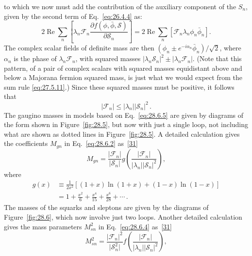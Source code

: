 to which we now must add the contribution of the auxiliary component of
the \(S_n\), given by the second term of Eq.~\eqref{eq:26.4.4} as:
\[
  2\operatorname{Re}\sum_n
  \left[
    \lambda_n\mathcal{F}_n
    \frac{\partial f(\phi,\bar\phi,\mathcal{S})}
         {\partial\mathcal{S}_n}
  \right]
  =2\operatorname{Re}\sum_n
  \left[\mathcal{F}_n\lambda_n\phi_n\bar\phi_n\right].
\]
The complex scalar fields of definite mass are then
\((\phi_n\pm e^{-i\alpha_n}\bar\phi_n)/\sqrt{2}\), where \(\alpha_n\) is
the phase of \(\lambda_n\mathcal{F}_n\), with squared masses
\(\lvert\lambda_n\mathcal{S}_n\rvert^2
\mathbin{\pm}\lvert\lambda_n\mathcal{F}_n\rvert\). (Note that this
pattern, of a pair of complex scalars with squared masses equidistant above
and below a Majorana fermion squared mass, is just what we would expect
from the sum rule \eqref{eq:27.5.11}.) Since these squared masses must be
positive, it follows that
\begin{equation}
  \lvert\mathcal{F}_n\rvert
  \leq\lvert\lambda_n\rvert\lvert\mathcal{S}_n\rvert^2\,.
  \tag{28.6.6}\label{eq:28.6.6}
\end{equation}
The gaugino masses in models based on Eq.~\eqref{eq:28.6.5} are given by
diagrams of the form shown in Figure~\ref{fig:28.5}, but now with just a
single loop, not including what are shown as dotted lines in
Figure~\ref{fig:28.5}. A detailed calculation gives the coefficients
\(M_{gn}\) in Eq.~\eqref{eq:28.6.2}
as~\hyperref[ch28-ref-31]{[31]}
\begin{equation}
  M_{gn}
  =\frac{\lvert\mathcal{F}_n\rvert}{\lvert\mathcal{S}_n\rvert}
  g\left(
    \frac{\lvert\mathcal{F}_n\rvert}
         {\lvert\lambda_n\rvert\lvert\mathcal{S}_n\rvert^2}
  \right),
  \tag{28.6.7}\label{eq:28.6.7}
\end{equation}
where
\begin{equation}
  \begin{aligned}
    g(x)
      &\equiv\frac{1}{2x^2}
      \left[(1+x)\ln(1+x)+(1-x)\ln(1-x)\right]\\
      &=1+\frac{x^2}{6}+\frac{x^4}{15}+\frac{x^6}{28}+\cdots\,.
  \end{aligned}
  \tag{28.6.8}\label{eq:28.6.8}
\end{equation}
The masses of the squarks and sleptons are given by the diagrams of
Figure~\ref{fig:28.6}, which now involve just two loops. Another detailed
calculation gives the mass parameters \(M_{sn}^2\) in
Eq.~\eqref{eq:28.6.4} as~\hyperref[ch28-ref-31]{[31]}
\begin{equation}
  M_{sn}^2
  =\frac{\lvert\mathcal{F}_n\rvert^2}
         {\lvert\mathcal{S}_n^2\rvert}
  f\left(
    \frac{\lvert\mathcal{F}_n\rvert}
         {\lvert\lambda_n\rvert\lvert\mathcal{S}_n\rvert^2}
  \right),
  \tag{28.6.9}\label{eq:28.6.9}
\end{equation}
